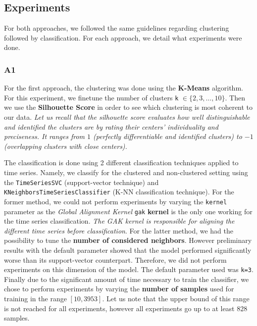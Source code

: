 \documentclass[sigplan,screen]{acmart}
\begin{document}
\subsection{Experiments}\label{subsec:eval}

For both approaches, we followed the same guidelines regarding clustering followed by classification. For each approach, we detail what experiments were done.

\subsubsection{A1}
For the first approach, the clustering was done using the \textbf{K-Means} algorithm. For this experiment, we finetune the number of clusters \texttt{k} $\in \{2,3,\ldots, 10\}$. Then we use the \textbf{Silhouette Score} in order to see which clustering is most coherent to our data. \textit{Let us recall that the silhouette score evaluates how well distinguishable and identified the clusters are by rating their centers’ individuality and preciseness. It ranges from $1$ (perfectly differentiable and identified clusters) to $-1$ (overlapping clusters with close centers).}

The classification is done using 2 different classification techniques applied to time series. Namely, we classify for the clustered and non-clustered setting using the \texttt{TimeSeriesSVC} (support-vector technique) and \\ \texttt{KNeighborsTimeSeriesClassifier} (K-NN classification technique). For the former method, we could not perform experiments by varying the \texttt{kernel} parameter as the \textit{Global Alignment Kernel} \texttt{gak} \textbf{kernel} is the only one working for the time series classification. \textit{The GAK kernel is responsible for aligning the different time series before classification}. For the latter method, we had the possibility to tune the \textbf{number of considered neighbors}. However preliminary results with the default parameter showed that the model performed significantly worse than its support-vector counterpart. Therefore, we did not perform experiments on this dimension of the model. The default parameter used was \texttt{k=3}. Finally due to the significant amount of time necessary to train the classifier, we chose to perform experiments by varying the \textbf{number of samples} used for training in the range $[10, 3953]$. Let us note that the upper bound of this range is not reached for all experiments, however all experiments go up to at least $828$ samples.
\end{document}
